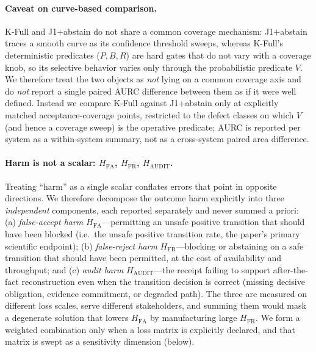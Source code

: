 \documentclass[sigconf,anonymous,review]{acmart}
\begin{document}
\paragraph{Caveat on curve-based comparison.} K-Full and J1$+$abstain do not share a common coverage mechanism: J1$+$abstain traces a smooth curve as its confidence threshold sweeps, whereas K-Full's deterministic predicates ($P,B,R$) are hard gates that do not vary with a coverage knob, so its selective behavior varies only through the probabilistic predicate $V$. We therefore treat the two objects as \emph{not} lying on a common coverage axis and do \emph{not} report a single paired AURC difference between them as if it were well defined. Instead we compare K-Full against J1$+$abstain only at explicitly matched acceptance-coverage points, restricted to the defect classes on which $V$ (and hence a coverage sweep) is the operative predicate; AURC is reported per system as a within-system summary, not as a cross-system paired area difference.

\paragraph{Harm is not a scalar: $H_{\mathrm{FA}}$, $H_{\mathrm{FR}}$, $H_{\mathrm{AUDIT}}$.} Treating ``harm'' as a single scalar conflates errors that point in opposite directions. We therefore decompose the outcome harm explicitly into three \emph{independent} components, each reported separately and never summed a priori: (a) \emph{false-accept harm} $H_{\mathrm{FA}}$---permitting an unsafe positive transition that should have been blocked (i.e.\ the unsafe positive transition rate, the paper's primary scientific endpoint); (b) \emph{false-reject harm} $H_{\mathrm{FR}}$---blocking or abstaining on a safe transition that should have been permitted, at the cost of availability and throughput; and (c) \emph{audit harm} $H_{\mathrm{AUDIT}}$---the receipt failing to support after-the-fact reconstruction even when the transition decision is correct (missing decisive obligation, evidence commitment, or degraded path). The three are measured on different loss scales, serve different stakeholders, and summing them would mask a degenerate solution that lowers $H_{\mathrm{FA}}$ by manufacturing large $H_{\mathrm{FR}}$. We form a weighted combination only when a loss matrix is explicitly declared, and that matrix is swept as a sensitivity dimension (below).
\end{document}
